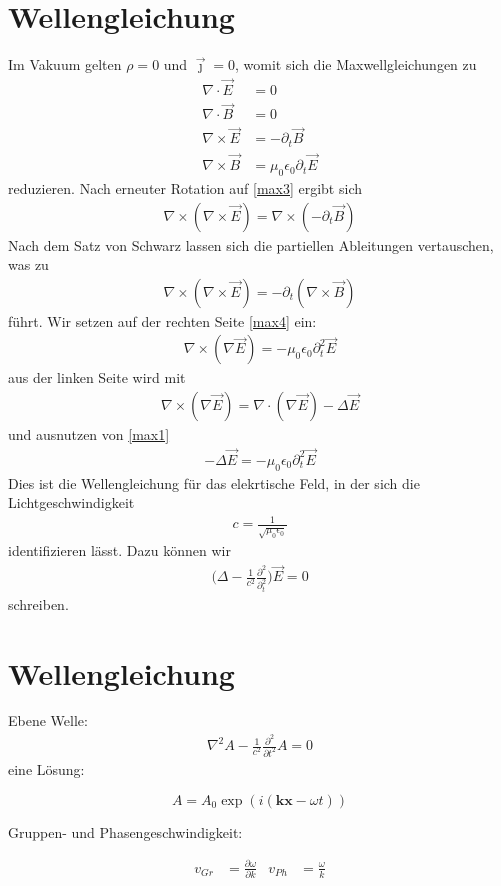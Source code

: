 \documentclass{scrartcl}
\begin{document}
 \section{Wellengleichung}
Im Vakuum gelten $\rho=0$ und $\vec{\jmath}=0$, womit sich die
Maxwellgleichungen zu
 \begin{align}
\nabla\cdot\vec{E} &= 0     \label{eqn:max1}\\
\nabla\cdot\vec{B} &= 0   \label{eqn:max2}  \\
\nabla\times\vec{E} &= -\partial_t\vec{B} \label{eqn:max3} \\
\nabla\times\vec{B} &= \mu_0\epsilon_0\partial_t{\vec{E}} \label{eqn:max4}
 \end{align}
 reduzieren. Nach erneuter Rotation auf \eqref{max3} ergibt sich
 \begin{align}
   \nabla\times(\nabla\times\vec{E}) = \nabla\times(-\partial_t\vec{B})
   \label{eqn:9}
 \end{align}
 Nach dem Satz von Schwarz lassen sich die partiellen Ableitungen
 vertauschen, was zu
 \begin{align}
   \nabla\times(\nabla\times\vec{E}) = -\partial_t(\nabla\times\vec{B})
   \label{eqn:10}
 \end{align}
 führt. Wir setzen auf der rechten Seite \eqref{max4} ein:
 \begin{align}
   \nabla\times(\nabla\vec{E})=-\mu_0\epsilon_0\partial_t^2\vec{E}
   \label{eqn:11}
 \end{align}
 aus der linken Seite wird mit
 \begin{align}
 \nabla\times(\nabla\vec{E})= \nabla\cdot(\nabla\vec{E})- \Delta\vec{E}
 \label{eqn:12}
 \end{align}
 und ausnutzen von \eqref{max1}
 \begin{align}
   -\Delta\vec{E}=-\mu_0\epsilon_0\partial_t^2\vec{E}
   \label{eqn:13}
 \end{align}
 Dies ist die Wellengleichung für das elekrtische Feld,
 in der sich die Lichtgeschwindigkeit
 \begin{align}
 c=\frac{1}{\sqrt{\mu_0\epsilon_0}} \label{eqn:14}
\end{align}
identifizieren lässt. Dazu können wir
\begin{align}
  \biggl(\Delta-\frac{1}{c^2}\frac{\partial^2}{\partial_t^2}\biggr)\vec{E}=0
\end{align}
\label{eqn:15}
schreiben.

\section{Wellengleichung}
Ebene Welle:
\begin{align}
  \nabla^2 A - \frac{1}{c^2}\frac{\partial^2}{\partial t^2}A= 0
\end{align}
eine Lösung:

\begin{equation}
  A=A_0\exp (i({\symbf{kx}-\omega t}))  %
\end{equation}

Gruppen- und Phasengeschwindigkeit:

\begin{align}
  v_{Gr} &=\frac{\partial\omega}{\partial k} &
  v_{Ph} &= \frac{\omega}{k}
\end{align}
\end{document}
